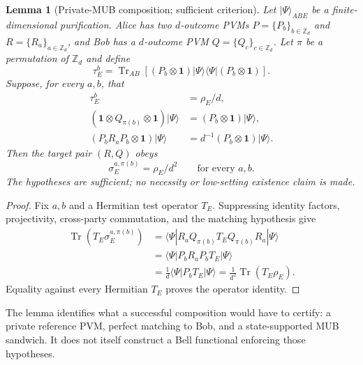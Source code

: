 \documentclass[11pt]{article}
\newtheorem{lemma}[theorem]{Lemma}
\theoremstyle{definition}
\theoremstyle{remark}
\newcommand{\Id}{\mathbf 1}
\newcommand{\Tr}{\operatorname{Tr}}
\newcommand{\bbZ}{\mathbb Z}
\begin{document}
\begin{lemma}[Private-MUB composition; sufficient criterion]
\label{lem:private-mub}
Let \(\lvert\Psi\rangle_{ABE}\) be a finite-dimensional purification.
Alice has two \(d\)-outcome PVMs \(P=\{P_b\}_{b\in\bbZ_d}\) and
\(R=\{R_a\}_{a\in\bbZ_d}\), and Bob has a \(d\)-outcome PVM
\(Q=\{Q_c\}_{c\in\bbZ_d}\).  Let \(\pi\) be a permutation of \(\bbZ_d\)
and define
\[
 \tau_E^b=\Tr_{AB}\!\left[(P_b\otimes\Id)
 \lvert\Psi\rangle\!\langle\Psi\rvert(P_b\otimes\Id)\right].
\]
Suppose, for every \(a,b\), that
\begin{align*}
 \tau_E^b&=\rho_E/d,\\
 (\Id\otimes Q_{\pi(b)}\otimes\Id)\lvert\Psi\rangle
 &=(P_b\otimes\Id)\lvert\Psi\rangle,\\
 (P_bR_aP_b\otimes\Id)\lvert\Psi\rangle
 &=d^{-1}(P_b\otimes\Id)\lvert\Psi\rangle.
\end{align*}
Then the target pair \((R,Q)\) obeys
\[
 \sigma_E^{a,\pi(b)}=\rho_E/d^2
 \qquad\text{for every }a,b.
\]
The hypotheses are sufficient; no necessity or low-setting existence claim
is made.
\end{lemma}

\begin{proof}
Fix \(a,b\) and a Hermitian test operator \(T_E\).  Suppressing identity
factors, projectivity, cross-party commutation, and the matching hypothesis
give
\begin{align*}
 \Tr(T_E\sigma_E^{a,\pi(b)})
 &=\langle\Psi|R_aQ_{\pi(b)}T_EQ_{\pi(b)}R_a|\Psi\rangle\\
 &=\langle\Psi|P_bR_aP_bT_E|\Psi\rangle\\
 &=\frac1d\langle\Psi|P_bT_E|\Psi\rangle
 =\frac1{d^2}\Tr(T_E\rho_E).
\end{align*}
Equality against every Hermitian \(T_E\) proves the operator identity.
\end{proof}

The lemma identifies what a successful composition would have to certify:
a private reference PVM, perfect matching to Bob, and a state-supported MUB
sandwich.  It does not itself construct a Bell functional enforcing those
hypotheses.
\end{document}
